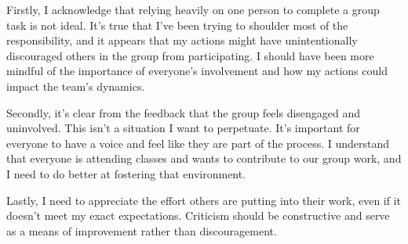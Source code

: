 Firstly, I acknowledge that relying heavily on one person to complete a group task is not ideal. It's true that I've been trying to shoulder most of the responsibility, and it appears that my actions might have unintentionally discouraged others in the group from participating. I should have been more mindful of the importance of everyone's involvement and how my actions could impact the team's dynamics.

Secondly, it's clear from the feedback that the group feels disengaged and uninvolved. This isn't a situation I want to perpetuate. It's important for everyone to have a voice and feel like they are part of the process. I understand that everyone is attending classes and wants to contribute to our group work, and I need to do better at fostering that environment.

Lastly, I need to appreciate the effort others are putting into their work, even if it doesn't meet my exact expectations. Criticism should be constructive and serve as a means of improvement rather than discouragement.
